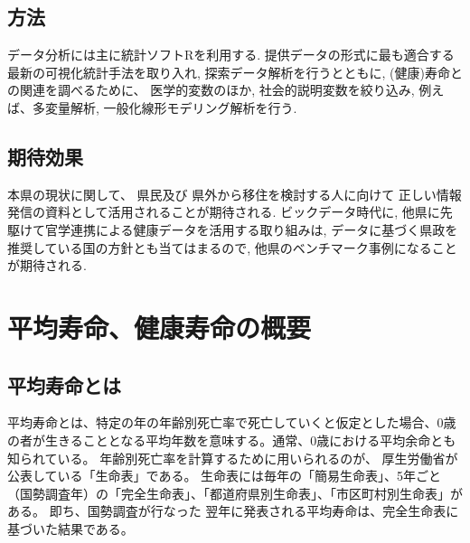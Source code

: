 \section{方法}
データ分析には主に統計ソフトRを利用する. 提供データの形式に最も適合する最新の可視化統計手法を取り入れ, 探索データ解析を行うとともに, (健康)寿命との関連を調べるために、
医学的変数のほか, 社会的説明変数を絞り込み, 
例えば、多変量解析, 一般化線形モデリング解析を行う. 



\section{期待効果}
本県の現状に関して、
県民及び
県外から移住を検討する人に向けて
正しい情報発信の資料として活用されることが期待される.
ビックデータ時代に, 他県に先駆けて官学連携による健康データを活用する取り組みは, データに基づく県政を推奨している国の方針とも当てはまるので, 他県のベンチマーク事例になることが期待される.


\chapter{平均寿命、健康寿命の概要}

\section{平均寿命とは}


平均寿命とは、特定の年の年齢別死亡率で死亡していくと仮定とした場合、0歳の者が生きることとなる平均年数を意味する。通常、0歳における平均余命とも知られている。
年齢別死亡率を計算するために用いられるのが、
厚生労働省が公表している「生命表」である。
生命表には毎年の「簡易生命表」、5年ごと（国勢調査年）の「完全生命表」、「都道府県別生命表」、「市区町村別生命表」がある。
即ち、国勢調査が行なった
翌年に発表される平均寿命は、完全生命表に基づいた結果である。


%
%
%
%
%
%
%
%




